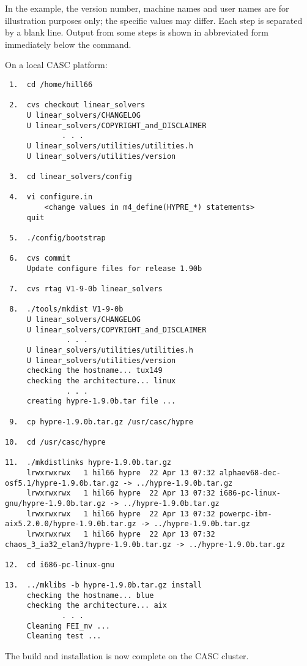 In the example, the version number, machine names and user names are for illustration 
purposes only; the specific values may differ. Each step is separated by a blank line.
Output from some steps is shown in abbreviated form immediately below the command.

On a local CASC platform:
\begin{verbatim}
 1.  cd /home/hill66

 2.  cvs checkout linear_solvers
     U linear_solvers/CHANGELOG
     U linear_solvers/COPYRIGHT_and_DISCLAIMER
             . . .
     U linear_solvers/utilities/utilities.h
     U linear_solvers/utilities/version

 3.  cd linear_solvers/config

 4.  vi configure.in
         <change values in m4_define(HYPRE_*) statements>
     quit

 5.  ./config/bootstrap

 6.  cvs commit
     Update configure files for release 1.90b

 7.  cvs rtag V1-9-0b linear_solvers

 8.  ./tools/mkdist V1-9-0b
     U linear_solvers/CHANGELOG
     U linear_solvers/COPYRIGHT_and_DISCLAIMER
              . . .
     U linear_solvers/utilities/utilities.h
     U linear_solvers/utilities/version
     checking the hostname... tux149
     checking the architecture... linux
              . . .
     creating hypre-1.9.0b.tar file ...

 9.  cp hypre-1.9.0b.tar.gz /usr/casc/hypre

10.  cd /usr/casc/hypre

11.  ./mkdistlinks hypre-1.9.0b.tar.gz
     lrwxrwxrwx   1 hil66 hypre  22 Apr 13 07:32 alphaev68-dec-osf5.1/hypre-1.9.0b.tar.gz -> ../hypre-1.9.0b.tar.gz
     lrwxrwxrwx   1 hil66 hypre  22 Apr 13 07:32 i686-pc-linux-gnu/hypre-1.9.0b.tar.gz -> ../hypre-1.9.0b.tar.gz
     lrwxrwxrwx   1 hil66 hypre  22 Apr 13 07:32 powerpc-ibm-aix5.2.0.0/hypre-1.9.0b.tar.gz -> ../hypre-1.9.0b.tar.gz
     lrwxrwxrwx   1 hil66 hypre  22 Apr 13 07:32 chaos_3_ia32_elan3/hypre-1.9.0b.tar.gz -> ../hypre-1.9.0b.tar.gz

12.  cd i686-pc-linux-gnu

13.  ../mklibs -b hypre-1.9.0b.tar.gz install
     checking the hostname... blue
     checking the architecture... aix
             . . .
     Cleaning FEI_mv ...
     Cleaning test ...
\end{verbatim}
The build and installation is now complete on the CASC cluster.

